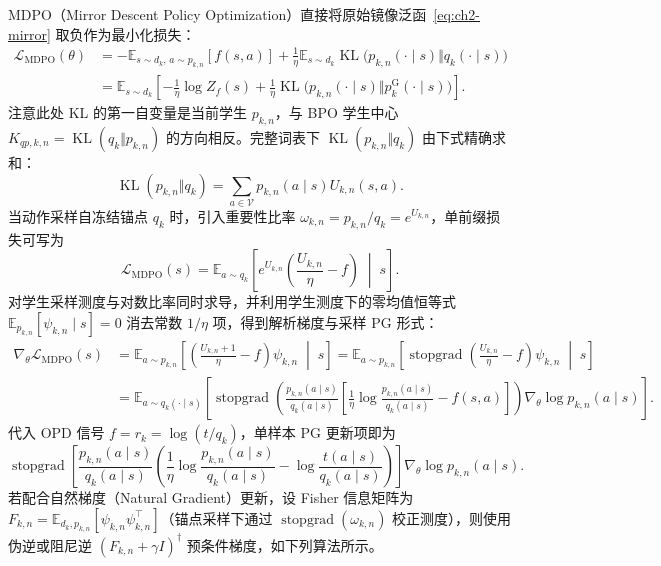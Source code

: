 \documentclass[lang=cn,scheme=chinese,openany]{elegantbook}
\newcommand{\KL}{\operatorname{KL}}
\newcommand{\sg}{\operatorname{stopgrad}}
\begin{document}
MDPO（Mirror Descent Policy Optimization）直接将原始镜像泛函~\eqref{eq:ch2-mirror} 取负作为最小化损失：
\begin{align}
\mathcal L_{\mathrm{MDPO}}(\theta)
&=-\mathbb E_{s\sim d_k,\,a\sim p_{k,n}}[f(s,a)]
+\frac1\eta\mathbb E_{s\sim d_k}\operatorname{KL}\bigl( p_{k,n}(\cdot\mid s)\Vert q_k(\cdot\mid s)\bigr)
\label{eq:ch2-mdpo-objective-bridge}\\
&=\mathbb E_{s\sim d_k}\left[-\frac1\eta\log Z_f(s)
+\frac1\eta\operatorname{KL}\bigl( p_{k,n}(\cdot\mid s)\Vert p_k^{\mathrm G}(\cdot\mid s)\bigr)\right].
\label{eq:ch2-mdpo-kl-gap}
\end{align}
注意此处 KL 的第一自变量是当前学生 $p_{k,n}$，与 BPO 学生中心 $K_{qp,k,n}=\KL(q_k\Vert p_{k,n})$ 的方向相反。完整词表下 $\KL(p_{k,n}\Vert q_k)$ 由下式精确求和：
\begin{equation}
\operatorname{KL}( p_{k,n}\Vert q_k)
=\sum_{a\in\mathcal V} p_{k,n}(a\mid s)U_{k,n}(s,a).
\label{eq:ch2-mdpo-full-kl}
\end{equation}
当动作采样自冻结锚点 $q_k$ 时，引入重要性比率 $\omega_{k,n}=p_{k,n}/q_k=e^{U_{k,n}}$，单前缀损失可写为
\begin{equation}
\mathcal L_{\mathrm{MDPO}}(s)
=\mathbb E_{a\sim q_k}\left[e^{U_{k,n}}\left(\frac{U_{k,n}}\eta-f\right)\;\middle|\; s\right].
\label{eq:ch2-mdpo-sample-integrand}
\end{equation}
对学生采样测度与对数比率同时求导，并利用学生测度下的零均值恒等式 $\mathbb E_{p_{k,n}}[\psi_{k,n}\mid s]=0$ 消去常数 $1/\eta$ 项，得到解析梯度与采样 PG 形式：
\begin{align}
\nabla_\theta\mathcal L_{\mathrm{MDPO}}(s)
&=\mathbb E_{a\sim p_{k,n}}\left[\left(\frac{U_{k,n}+1}\eta-f\right)\psi_{k,n}\;\middle|\; s\right]
=\mathbb E_{a\sim p_{k,n}}\left[\sg\!\left(\frac{U_{k,n}}\eta-f\right)\psi_{k,n}\;\middle|\; s\right]
\label{eq:ch2-mdpo-gradient-bridge}\\
&=\mathbb E_{a\sim q_k(\cdot\mid s)}\left[
\sg\!\left(
\frac{ p_{k,n}(a\mid s)}{ q_k(a\mid s)}
\left[\frac1\eta\log\frac{ p_{k,n}(a\mid s)}{ q_k(a\mid s)}-f(s,a)\right]
\right)\nabla_\theta\log p_{k,n}(a\mid s)\right].
\label{eq:ch2-mdpo-generic-gradient,eq:ch2-mdpo-pg}
\end{align}
代入 OPD 信号 $f=r_k=\log(t/q_k)$，单样本 PG 更新项即为
\begin{equation}
\label{eq:ch2-mdpo-opd-pg}
\sg\!\left[
\frac{ p_{k,n}(a\mid s)}{ q_k(a\mid s)}
\left(\frac1\eta\log\frac{ p_{k,n}(a\mid s)}{ q_k(a\mid s)}
-\log\frac{ t(a\mid s)}{ q_k(a\mid s)}\right)
\right]\nabla_\theta\log p_{k,n}(a\mid s).
\end{equation}
若配合自然梯度（Natural Gradient）更新，设 Fisher 信息矩阵为 $F_{k,n}=\mathbb E_{d_k, p_{k,n}}[\psi_{k,n}\psi_{k,n}^\top]$（锚点采样下通过 $\sg(\omega_{k,n})$ 校正测度），则使用伪逆或阻尼逆 $(F_{k,n}+\gamma I)^\dagger$ 预条件梯度，如下列算法所示。
\end{document}
